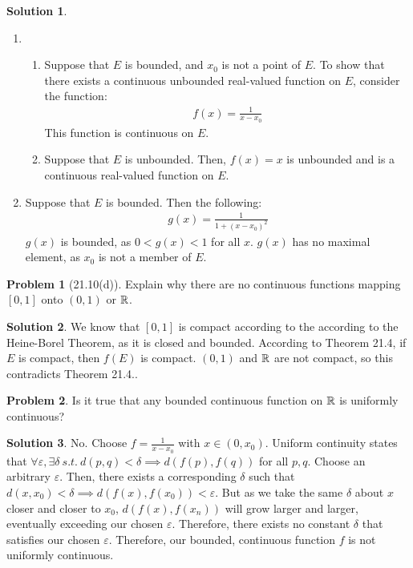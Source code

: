 \documentclass[12pt]{article}
\theoremstyle{definition} %
\newtheorem{solution}{Solution}
\newtheorem{problem}{Problem}
\theoremstyle{plain} %
\begin{document}
\begin{solution}
 \begin{enumerate}
  \item \begin{enumerate}
    \item Suppose that $E$ is bounded, and $x_0$ is not a point of $E$. To show that there exists a continuous unbounded real-valued function on $E$, consider the function:
    \begin{align}
     f(x)=\frac{1}{x-x_0}
    \end{align} 
    This function is continuous on $E$.
    \item Suppose that $E$ is unbounded. Then, $f(x)=x$ is unbounded and is a continuous real-valued function on $E$. 
  \end{enumerate}
  \item Suppose that $E$ is bounded. Then the following:
  \begin{align}
    g(x)=\frac{1}{1+(x-x_0)^{2}}
  \end{align}
$g(x)$ is bounded, as $0<g(x)<1$ for all $x$. $g(x)$ has no maximal element, as $x_0$ is not a member of $E$. 
 \end{enumerate} 
\end{solution}
\begin{problem}[21.10(d)]
    Explain why there are no continuous functions mapping $[0,1]$ onto $(0,1)$ or $\mathbb{\MakeUppercase{r}}$.
\end{problem}
\begin{solution}
  We know that $[0,1]$ is compact according to the according to the Heine-Borel Theorem, as it is closed and bounded. According to Theorem 21.4, if $E$ is compact, then $f(E)$ is compact. $(0,1)$ and $\mathbb{\MakeUppercase{r}}$ are not compact, so this contradicts Theorem 21.4..
\end{solution}
\begin{problem}
  Is it true that any bounded continuous function on $\mathbb{\MakeUppercase{r}}$ is uniformly continuous? 
\end{problem}
\begin{solution}
  No. Choose $f=\frac{1}{x-x_0}$ with $x\in (0,x_0)$. Uniform continuity states that $\forall \varepsilon, \exists \delta \ s.t. \ d(p,q)<\delta \implies d(f(p),f(q))$ for all $p, q$. Choose an arbitrary $\varepsilon$. Then, there exists a corresponding $\delta$ such that $d(x,x_0)<\delta\implies d(f(x),f(x_0))<\varepsilon$. But as we take the same $\delta$ about $x$ closer and closer to $x_0$, $d(f(x),f(x_n))$ will grow larger and larger, eventually exceeding our chosen $\varepsilon$. Therefore, there exists no constant $\delta$ that satisfies our chosen $\varepsilon$. Therefore, our bounded, continuous function $f$ is not uniformly continuous.    
\end{solution}
\end{document}
